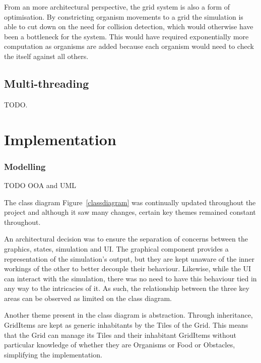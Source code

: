 \documentclass[a4paper, oneside, 11pt]{report}
\begin{document}
From an more architectural perspective, the grid system is also a form of optimisation. By constricting organism movements to a grid the simulation is able to cut down on the need for collision detection, which would otherwise have been a bottleneck for the system. This would have required exponentially more computation as organisms are added because each organism would need to check the itself against all others.

\section{Multi-threading}
TODO.

\chapter{Implementation} \label{implementation}

\subsection{Modelling}

TODO OOA and UML

The class diagram Figure~\ref{classdiagram} was continually updated throughout the project and although it saw many changes, certain key themes remained constant throughout.

An architectural decision was to ensure the separation of concerns between the graphics, states, simulation and UI. The graphical component provides a representation of the simulation's output, but they are kept unaware of the inner workings of the other to better decouple their behaviour. Likewise, while the UI can interact with the simulation, there was no need to have this behaviour tied in any way to the intricacies of it. As such, the relationship between the three key areas can be observed as limited on the class diagram.

Another theme present in the class diagram is abstraction. Through inheritance, GridItems are kept as generic inhabitants by the Tiles of the Grid. This means that the Grid can manage its Tiles and their inhabitant GridItems without particular knowledge of whether they are Organisms or Food or Obstacles, simplifying the implementation.
\end{document}
